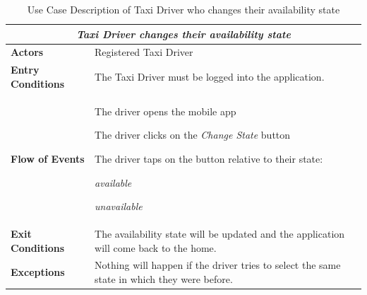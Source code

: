 \documentclass[a4paper]{article}
\begin{document}
\begin{table} [H]
\begin{center}
\begin{tabular}{ |m{}|m{}|  }
\hline
    \multicolumn{2}{|c|}{\textbf{\textit{Taxi Driver changes their availability state}}} \\
\hline \hline
    \textbf{Actors}
&   Registered Taxi Driver
\\ \hline
    \textbf{Entry Conditions}
&   The Taxi Driver must be logged into the application.
\\ \hline
    \textbf{Flow of Events}
& 
    \begin{enumerate*}
    \item The driver opens the mobile app
    \item The driver clicks on the \emph{Change State} button
    \item The driver taps on the button relative to their state:
        \begin{itemize*}
        \item \emph{available}
        \item \emph{unavailable}
        \end{itemize*}
    \end{enumerate*}
\\ \hline
    \textbf{Exit Conditions}
&  The availability state will be updated and the application will come back to the home.
\\ \hline
    \textbf{Exceptions}
&   Nothing will happen if the driver tries to select the same state in which they were before.
\\ \hline
\end{tabular}
\end{center}
\caption{Use Case Description of Taxi Driver who changes their availability state}
\label{table:taxichangestate}
\end{table}
\end{document}
